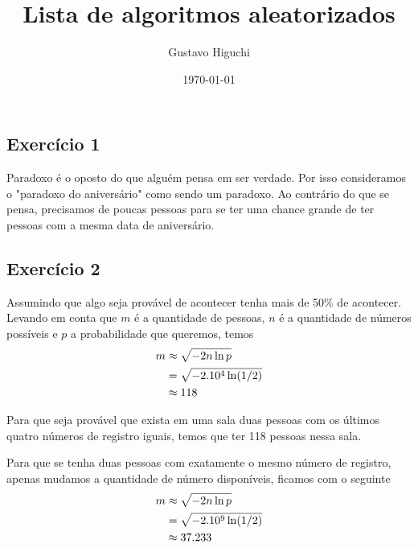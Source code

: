 \documentclass{article}
\title{Lista de algoritmos aleatorizados}
\author{Gustavo Higuchi}
\date{\today}
\begin{document}
\maketitle

\tableofcontents
\newpage


\chapter{}
\section{Exercício 1}
\hspace*{15pt} Paradoxo é o oposto do que alguém pensa em ser
verdade. Por isso consideramos o "paradoxo do aniversário" como
sendo um paradoxo. Ao contrário do que se pensa, precisamos de poucas
pessoas para se ter uma chance grande de ter pessoas com a mesma data 
de aniversário.

\section{Exercício 2}
Assumindo que algo seja provável de acontecer tenha mais de 50\% de acontecer.\\

Levando em conta que $m$ é a quantidade de pessoas, $n$ é a quantidade de 
números possíveis e $p$ a probabilidade que queremos, temos\\

\begin{equation}
	\notag
	\begin{split}
		m &\approx \sqrt{-2n \ln p}\\
		&= \sqrt{-2.10^4 \ln(1/2)}\\
		&\approx 118
	\end{split}
\end{equation}

Para que seja provável que exista em uma sala duas pessoas com os últimos 
quatro números de registro iguais, temos que ter 118 pessoas nessa sala.

Para que se tenha duas pessoas com exatamente o mesmo número de registro,
apenas mudamos a quantidade de número disponíveis, ficamos com o seguinte
\begin{equation}
	\notag
	\begin{split}
		m &\approx \sqrt{-2n \ln p}\\
		&= \sqrt{-2.10^9 \ln (1/2)}\\
		&\approx 37.233
	\end{split}
\end{equation}
\end{document}
